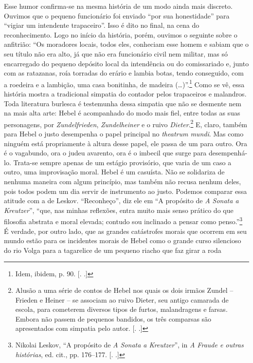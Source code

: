 Esse humor confirma-se na mesma história de um modo ainda mais discreto.
Ouvimos que o pequeno funcionário foi enviado ``por sua honestidade''
para ``vigiar um intendente trapaceiro''. Isso é dito no final, na cena
do reconhecimento. Logo no início da história, porém, ouvimos o seguinte
sobre o anfitrião: ``Os moradores locais, todos eles, conheciam esse
homem e sabiam que o seu título não era alto, já que não era funcionário
civil nem militar, mas só encarregado do pequeno depósito local da
intendência ou do comissariado e, junto com as ratazanas, roía torradas
do erário e lambia botas, tendo conseguido, com a roedeira e a lambição,
uma casa bonitinha, de madeira (\ldots{})''.\footnote{Idem, ibidem, p. 90.
  [. .]} Como se vê, essa história mostra a tradicional
simpatia do contador pelos trapaceiros e malandros. Toda literatura
burlesca é testemunha dessa simpatia que não se desmente nem na mais
alta arte: Hebel é acompanhado do modo mais fiel, entre todas as suas
personagens, por \emph{Zundelfrieden}, \emph{Zundelheiner} e o ruivo
\emph{Dieter}.\footnote{Alusão a uma série de contos de Hebel nos quais
  os dois irmãos Zundel -- Frieden e Heiner -- se associam ao ruivo
  Dieter, seu antigo camarada de escola, para cometerem diversos tipos
  de furtos, malandragens e farsas. Embora não passem de pequenos
  bandidos, os três comparsas são apresentados com simpatia pelo autor.
  [. .]} E, claro, também para Hebel o justo desempenha o papel
principal no \emph{theatrum mundi}. Mas como ninguém está propriamente à
altura desse papel, ele passa de um para outro. Ora é o vagabundo, ora o
judeu avarento, ora é o imbecil que surge para desempenhá-lo. Trata-se
sempre apenas de um estágio provisório, que varia de um caso a outro,
uma improvisação moral. Hebel é um casuísta. Não se solidariza de
nenhuma maneira com algum princípio, mas também não recusa nenhum deles,
pois todos podem um dia servir de instrumento ao justo. Podemos comparar
essa atitude com a de Leskov. ``Reconheço'', diz ele em ``A propósito de
\emph{A Sonata a Kreutzer}'', ``que, nas minhas reflexões, entra muito
mais senso prático do que filosofia abstrata e moral elevada; contudo
sou inclinado a pensar como penso.''\footnote{Nikolai Leskov, ``A
  propósito de \emph{A Sonata a Kreutzer}'', in \emph{A Fraude e outras
  histórias}, ed. cit., pp. 176--177. [. .]} É verdade, por
outro lado, que as grandes catástrofes morais que ocorrem em seu mundo
estão para os incidentes morais de Hebel como o grande curso silencioso
do rio Volga para a tagarelice de um pequeno riacho que faz girar a roda
